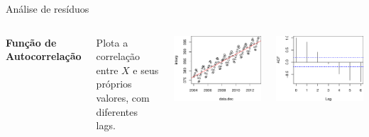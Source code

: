 \documentclass{beamer}\usepackage[]{graphicx}\usepackage[]{color}
\newenvironment{knitrout}{}{} %
\renewenvironment{knitrout}{\setlength{\topsep}{0mm}}{}
\begin{document}
\begin{frame}{Análise de resíduos}

\begin{columns}[c]

\small


\textbf{Função de Autocorrelação}

\bigskip
Plota a correlação entre $X$ e seus próprios valores, com diferentes lags.


\begin{knitrout}
\color{fgcolor}
\includegraphics[width=1\linewidth]{figure/r101-1} 

\includegraphics[width=1\linewidth]{figure/r101-2} 

\end{knitrout}
\end{columns}

\end{frame}
\end{document}
